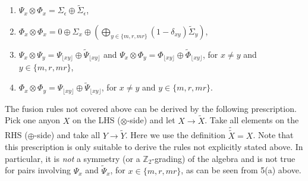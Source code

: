 \documentclass[two column]{article}
\begin{document}
\begin{enumerate}
\begin{enumerate}
		\item $\Psi_x \otimes \Phi_x = \Sigma_\epsilon \oplus \tilde\Sigma_\epsilon$,
		\item $\Phi_x \otimes \Phi_x = 0 \oplus \Sigma_x \oplus (\bigoplus_{y \in \{m, r, mr\}}(1-\delta_{xy})\tilde\Sigma_y)$,
		\item $\Psi_x \otimes \Psi_y = \Psi_{\lfloor xy \rfloor} \oplus \tilde\Psi_{\lfloor xy \rfloor}$ and $\Psi_x \otimes \Phi_y = \Phi_{\lfloor xy \rfloor} \oplus \tilde\Phi_{\lfloor xy \rfloor}$, for $x \neq y$ and $y \in \{m, r, mr\}$,
		\item $\Phi_x \otimes \Phi_y  = \Psi_{\lfloor xy \rfloor} \oplus \tilde\Psi_{\lfloor xy \rfloor}$, for $x \neq y$ and $y \in \{m, r, mr\}$.
\end{enumerate}
\end{enumerate}
The fusion rules not covered above can be derived by the following prescription. Pick one anyon $X$ on the LHS ($\otimes$-side) and let $X \rightarrow \tilde X$. Take all elements on the RHS ($\oplus$-side) and take all $Y \rightarrow \tilde Y$. Here we use the definition $\tilde{\tilde{X}} = X$. 
	Note that this prescription is only suitable to derive the rules not explicitly stated above. In particular, it is \emph{not} a symmetry (or a $\mathbb{Z}_2$-grading) of the algebra and is not true for pairs involving $\Psi_x$ and $\tilde\Psi_x$, for $x \in \{m, r, mr\}$, as can be seen from 5(a) above.
\end{document}
